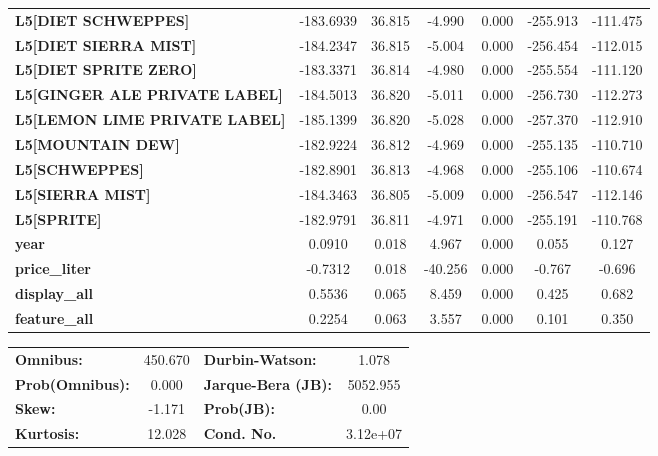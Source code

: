 \begin{center}
\begin{tabular}{lcccccc}
\textbf{L5[DIET SCHWEPPES]}                &    -183.6939  &       36.815     &    -4.990  &         0.000        &     -255.913    &     -111.475     \\
\textbf{L5[DIET SIERRA MIST]}              &    -184.2347  &       36.815     &    -5.004  &         0.000        &     -256.454    &     -112.015     \\
\textbf{L5[DIET SPRITE ZERO]}              &    -183.3371  &       36.814     &    -4.980  &         0.000        &     -255.554    &     -111.120     \\
\textbf{L5[GINGER ALE PRIVATE LABEL]}      &    -184.5013  &       36.820     &    -5.011  &         0.000        &     -256.730    &     -112.273     \\
\textbf{L5[LEMON LIME PRIVATE LABEL]}      &    -185.1399  &       36.820     &    -5.028  &         0.000        &     -257.370    &     -112.910     \\
\textbf{L5[MOUNTAIN DEW]}                  &    -182.9224  &       36.812     &    -4.969  &         0.000        &     -255.135    &     -110.710     \\
\textbf{L5[SCHWEPPES]}                     &    -182.8901  &       36.813     &    -4.968  &         0.000        &     -255.106    &     -110.674     \\
\textbf{L5[SIERRA MIST]}                   &    -184.3463  &       36.805     &    -5.009  &         0.000        &     -256.547    &     -112.146     \\
\textbf{L5[SPRITE]}                        &    -182.9791  &       36.811     &    -4.971  &         0.000        &     -255.191    &     -110.768     \\
\textbf{year}                              &       0.0910  &        0.018     &     4.967  &         0.000        &        0.055    &        0.127     \\
\textbf{price\_liter}                      &      -0.7312  &        0.018     &   -40.256  &         0.000        &       -0.767    &       -0.696     \\
\textbf{display\_all}                      &       0.5536  &        0.065     &     8.459  &         0.000        &        0.425    &        0.682     \\
\textbf{feature\_all}                      &       0.2254  &        0.063     &     3.557  &         0.000        &        0.101    &        0.350     \\
\bottomrule
\end{tabular}
\begin{tabular}{lclc}
\textbf{Omnibus:}       & 450.670 & \textbf{  Durbin-Watson:     } &    1.078  \\
\textbf{Prob(Omnibus):} &   0.000 & \textbf{  Jarque-Bera (JB):  } & 5052.955  \\
\textbf{Skew:}          &  -1.171 & \textbf{  Prob(JB):          } &     0.00  \\
\textbf{Kurtosis:}      &  12.028 & \textbf{  Cond. No.          } & 3.12e+07  \\
\bottomrule
\end{tabular}
\end{center}

